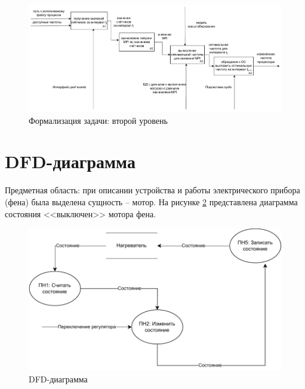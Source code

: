 \documentclass[12pt]{report}
\begin{document}
\begin{figure}[h]
  \centering
  \includegraphics[scale = 0.6]{idef0-1.pdf}
  \caption{Формализация задачи: второй уровень}
  \label{fig:dec}
\end{figure}





\section{DFD-диаграмма}
Предметная область: при описании устройства и работы электрического прибора (фена) была выделена сущность -- мотор. 
На рисунке \ref{fig:dfd} представлена диаграмма состояния <<выключен>> мотора фена.


\begin{figure}[h]
  \centering
  \includegraphics[scale = 0.8]{dfd.pdf}
  \caption{DFD-диаграмма}
  \label{fig:dfd}
\end{figure}
\end{document}
